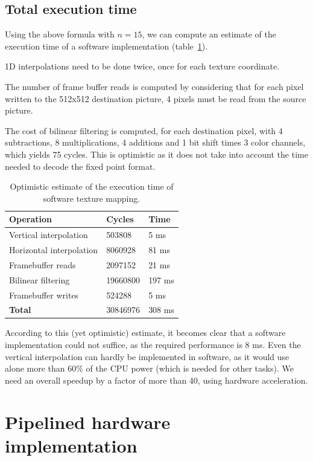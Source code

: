 \documentclass[a4paper,11pt]{kthesis}
\begin{document}
\subsection{Total execution time}
Using the above formula with $n=15$, we can compute an estimate of the execution time of a software implementation (table~\ref{tab:swtmutime}).

1D interpolations need to be done twice, once for each texture coordinate.

The number of frame buffer reads is computed by considering that for each pixel written to the 512x512 destination picture, 4 pixels must be read from the source picture.

The cost of bilinear filtering is computed, for each destination pixel, with 4 subtractions, 8 multiplications, 4 additions and 1 bit shift times 3 color channels, which yields 75 cycles. This is optimistic as it does not take into account the time needed to decode the fixed point format.

\begin{table}
\centering
\begin{tabular}{|l|l|l|}
\hline
\textbf{Operation} & \textbf{Cycles} & \textbf{Time} \\
\hline
Vertical interpolation & 503808 & 5 ms \\
\hline
Horizontal interpolation & 8060928 & 81 ms \\
\hline
Framebuffer reads & 2097152 & 21 ms \\
\hline
Bilinear filtering & 19660800 & 197 ms \\
\hline
Framebuffer writes & 524288 & 5 ms \\
\hline
\textbf{Total} & 30846976 & 308 ms \\
\hline
\end{tabular}
\caption{Optimistic estimate of the execution time of software texture mapping.}\label{tab:swtmutime}
\end{table}

According to this (yet optimistic) estimate, it becomes clear that a software implementation could not suffice, as the required performance is 8 ms. Even the vertical interpolation can hardly be implemented in software, as it would use alone more than 60\% of the CPU power (which is needed for other tasks). We need an overall speedup by a factor of more than 40, using hardware acceleration.

\section{Pipelined hardware implementation}
\end{document}
